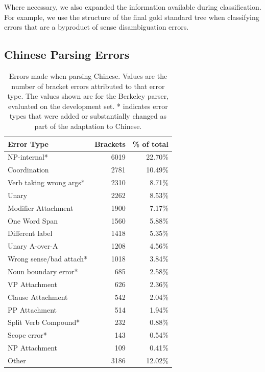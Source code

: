 Where necessary, we also expanded the information available during
classification.  For example, we use the structure of the final gold standard
tree when classifying errors that are a byproduct of sense disambiguation
errors.

\subsection{Chinese Parsing Errors} \label{sec:chinese_parsing_errors}

\begin{table}
\centering
\begin{tabular}{lrr}
  \hline
  Error Type & Brackets & \% of total \\
  \hline
  \hline
              NP-internal* & 6019 & 22.70\% \\
              Coordination & 2781 & 10.49\% \\
   Verb taking wrong args* & 2310 &  8.71\% \\
                     Unary & 2262 &  8.53\% \\
       Modifier Attachment & 1900 &  7.17\% \\
             One Word Span & 1560 &  5.88\% \\
           Different label & 1418 &  5.35\% \\
            Unary A-over-A & 1208 &  4.56\% \\
   Wrong sense/bad attach* & 1018 &  3.84\% \\
      Noun boundary error* &  685 &  2.58\% \\
             VP Attachment &  626 &  2.36\% \\
         Clause Attachment &  542 &  2.04\% \\
             PP Attachment &  514 &  1.94\% \\
      Split Verb Compound* &  232 &  0.88\% \\
              Scope error* &  143 &  0.54\% \\
             NP Attachment &  109 &  0.41\% \\
                     Other & 3186 & 12.02\% \\
\hline
\end{tabular}
\caption[Breakdown of errors in Chinese parsing.]{ \label{tab:errors} 
  Errors made when parsing Chinese. Values are the number of bracket errors
  attributed to that error type. The values shown are for the Berkeley parser,
  evaluated on the development set. * indicates error types that were added or
  substantially changed as part of the adaptation to Chinese.
}
\end{table}

